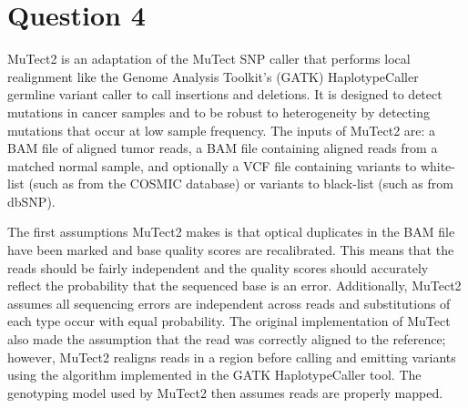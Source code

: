 \section{Question 4}

MuTect2 \parencite{cibulskis_sensitive_2013} is an adaptation of the MuTect SNP caller that performs local realignment like the Genome Analysis Toolkit's (GATK) HaplotypeCaller germline variant caller to call insertions and deletions. It is designed to detect mutations in cancer samples and to be robust to heterogeneity by detecting mutations that occur at low sample frequency. The inputs of MuTect2 are: a BAM file of aligned tumor reads, a BAM file containing aligned reads from a matched normal sample, and optionally a VCF file containing variants to white-list (such as from the COSMIC database) or variants to black-list (such as from dbSNP). 

The first assumptions MuTect2 makes is that optical duplicates in the BAM file have been marked and base quality scores are recalibrated. This means that the reads should be fairly independent and the quality scores should accurately reflect the probability that the sequenced base is an error. Additionally, MuTect2 assumes all sequencing errors are independent across reads and substitutions of each type occur with equal probability.
The original implementation of MuTect also made the assumption that the read was correctly aligned to the reference; however, MuTect2 realigns reads in a region before calling and emitting variants using the algorithm implemented in the GATK HaplotypeCaller tool. The genotyping model used by MuTect2 then assumes reads are properly mapped.



